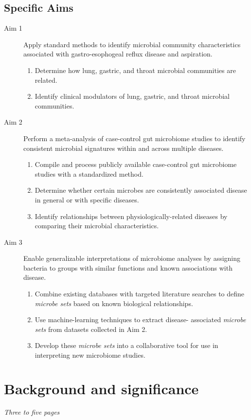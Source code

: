 \documentclass[12pt]{article}
\begin{document}
\subsection{Specific Aims}
\begin{description}
	\item[Aim 1] Apply standard methods to identify microbial 
	community characteristics associated with gastro-esophogeal reflux 
	disease and aspiration.
	\begin{enumerate}
		\item Determine how lung, gastric, and throat microbial 
		communities are related.
		\item Identify clinical modulators of lung, gastric, and 
		throat microbial communities.
	\end{enumerate}
	\item[Aim 2] Perform a meta-analysis of case-control gut 
	microbiome studies to identify consistent microbial signatures 
	within and across multiple diseases.
	\begin{enumerate}
		\item Compile and process publicly available case-control gut 
		microbiome studies with a standardized method.
		\item Determine whether certain microbes are consistently 
		associated disease in general or with specific diseases.
		\item Identify relationships between physiologically-related 
		diseases by comparing their microbial characteristics.
	\end{enumerate}
	\item[Aim 3] Enable generalizable interpretations of microbiome 
	analyses by assigning bacteria to groups with similar functions 
	and known associations with disease.
	\begin{enumerate}
		\item Combine existing databases with targeted literature searches 
		to define \textit{microbe sets} based on known biological 
		relationships.
		\item Use machine-learning techniques to extract disease-
		associated \textit{microbe sets} from datasets collected in Aim 2.
		\item Develop these \textit{microbe sets} into a collaborative 
		tool for use in interpreting new microbiome studies.
	\end{enumerate}
\end{description}
\newpage

\section{Background and significance}
\textit{Three to five pages}
\end{document}
